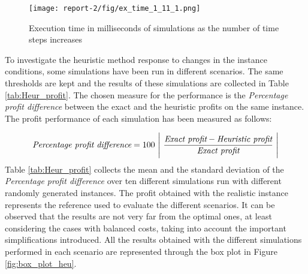 \documentclass{article}
\begin{document}
\begin{figure}[H]
    \centering
    \texttt{[image: report-2/fig/ex\_time\_1\_11\_1.png]}
    \caption{Execution time in milliseconds of simulations as the number of time steps increases}
    \label{fig:execution_time}
\end{figure}

To investigate the heuristic method response to changes in the instance conditions, some simulations have been run in different scenarios. The same thresholds are kept and the results of these simulations are collected in Table \ref{tab:Heur_profit}.
The chosen measure for the performance is the \textit{Percentage profit difference} between the exact and the heuristic profits on the same instance. The profit performance of each simulation has been measured as follows:

\begin{equation}
   \textit{Percentage profit difference} = 100 \  \Bigg|\ \frac{ \textit{Exact profit} - \textit{Heuristic profit} }{\textit{Exact profit}}\ \Bigg | \\ \label{over_prof}
\end{equation}
\newline
Table \ref{tab:Heur_profit} collects the mean and the standard deviation of the \textit{Percentage profit difference} over ten different simulations run with different randomly generated instances. The profit obtained with the realistic instance represents the reference used to evaluate the different scenarios.
\newline
It can be observed that the results are not very far from the optimal ones, at least considering the cases with balanced costs, taking into account the important simplifications introduced. All the results obtained with the different simulations performed in each scenario are represented through the box plot in Figure \ref{fig:box_plot_heu}.
\end{document}
